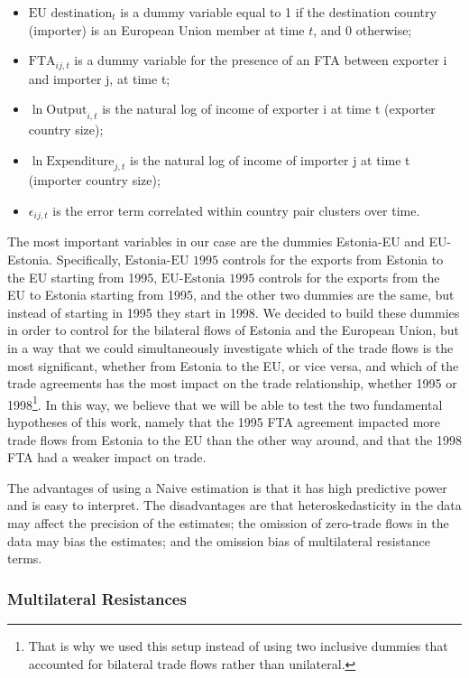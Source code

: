 \documentclass[a4paper,10pt]{article}
\begin{document}
\begin{spacing}{1}
\begin{itemize}
		\item $\text{EU destination}_{t}$ is a dummy variable equal to 1 if the destination country (importer) is an European Union member at time $t$, and 0 otherwise;
		\item $\text{FTA}_{ij,t}$ is a dummy variable for the presence of an FTA between exporter i and importer j, at time t;
		\item $\ln \text{Output}_{i,t}$ is the natural log of income of exporter i at time t (exporter country size); 
		\item $\ln \text{Expenditure}_{j,t}$ is the natural log of income of importer j at time t (importer country size);
		\item $\epsilon_{ij,t}$ is the error term correlated within country pair clusters over time.	
	\end{itemize}
\end{spacing}

The most important variables in our case are the dummies Estonia-EU and EU-Estonia. Specifically, $\text{Estonia-EU 1995}$ controls for the exports from Estonia to the EU starting from 1995, $\text{EU-Estonia 1995}$ controls for the exports from the EU to Estonia starting from 1995, and the other two dummies are the same, but instead of starting in 1995 they start in 1998. We decided to build these dummies in order to control for the bilateral flows of Estonia and the European Union, but in a way that we could simultaneously investigate which of the trade flows is the most significant, whether from Estonia to the EU, or vice versa, and which of the trade agreements has the most impact on the trade relationship, whether 1995 or 1998\footnote{That is why we used this setup instead of using two inclusive dummies that accounted for bilateral trade flows rather than unilateral.}. In this way, we believe that we will be able to test the two fundamental hypotheses of this work, namely that the 1995 FTA agreement impacted more trade flows from Estonia to the EU than the other way around, and that the 1998 FTA had a weaker impact on trade.

The advantages of using a Naive estimation is that it has high predictive power and is easy to interpret. The disadvantages are that heteroskedasticity in the data may affect the precision of the estimates; the omission of zero-trade flows in the data may bias the estimates; and the omission bias of multilateral resistance terms.

\subsubsection{Multilateral Resistances} \label{traditional_mr}
\end{document}
